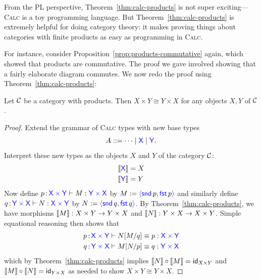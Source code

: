 From the PL perspective, Theorem~\ref{thm:calc-products} is not super exciting---\textsc{Calc}
is a toy programming language.
But Theorem~\ref{thm:calc-products} is extremely helpful for doing category theory:
it makes proving things about categories with finite products
as easy as programming in \textsc{Calc}.

For instance, consider Proposition~\ref{prop:products-commutative} again,
which showed that products are commutative.
The proof we gave involved showing that a fairly elaborate diagram commutes.
We now redo the proof using Theorem~\ref{thm:calc-products}:
\begin{proposition} \label{prop:product-comm-using-calc}
  Let \(\mathcal C\) be a category with products.
  Then \(X\times Y \cong Y \times X\)
  for any objects \(X,Y\) of \(\mathcal C\).
\end{proposition}
\begin{proof}
  Extend the grammar of \textsc{Calc} types with new base types
  \[
  A ::= \dots \mid \mathsf{{\color{blue}X}} \mid \mathsf{{\color{blue}Y}}.
  \]
  Interpret these new types as the objects \(X\) and \(Y\) of the category \(\mathcal C\):
  \begin{align*}
    \left\llbracket \mathsf{{\color{blue}X}}\right\rrbracket &= X \\
    \left\llbracket \mathsf{{\color{blue}Y}}\right\rrbracket &= Y
  \end{align*}
  Now define \(p \,{:}\, \mathsf{{\color{blue}X}} \mathbin{{\color{blue}\times}} \mathsf{{\color{blue}Y}} \vdash M : \mathsf{{\color{blue}Y}} \mathbin{{\color{blue}\times}} \mathsf{{\color{blue}X}}\) by
  \(
  M := \plpair{\plsnd{p}}{\plfst{p}}
  \)
  and similarly define
  \(q \,{:}\, \mathsf{{\color{blue}Y}} \mathbin{{\color{blue}\times}} \mathsf{{\color{blue}X}} \vdash N : \mathsf{{\color{blue}X}} \mathbin{{\color{blue}\times}} \mathsf{{\color{blue}Y}}\) by
  \(N := \plpair{\plsnd{q}}{\plfst{q}}\).
  By Theorem~\ref{thm:calc-products},
  we have morphisms \(\left\llbracket M\right\rrbracket : X \times Y \to Y \times X\)
  and \(\left\llbracket N\right\rrbracket : Y \times X \to X \times Y\).
  Simple equational reasoning then shows that
  \begin{align}
    p\,{:}\,\mathsf{{\color{blue}X}}\mathbin{{\color{blue}\times}}\mathsf{{\color{blue}Y}} \vdash N[M/q] &\equiv p : \mathsf{{\color{blue}X}}\mathbin{{\color{blue}\times}}\mathsf{{\color{blue}Y}}
    \\
    q\,{:}\,\mathsf{{\color{blue}Y}}\mathbin{{\color{blue}\times}}\mathsf{{\color{blue}X}} \vdash M[N/p] &\equiv q : \mathsf{{\color{blue}Y}}\mathbin{{\color{blue}\times}}\mathsf{{\color{blue}X}}
  \end{align}
  which by Theorem~\ref{thm:calc-products}
  implies \(\left\llbracket N\right\rrbracket \circ \left\llbracket M\right\rrbracket = \mathsf{id}_{X\times Y}\)
  and \(\left\llbracket M\right\rrbracket \circ \left\llbracket N\right\rrbracket = \mathsf{id}_{Y\times X}\)
  as needed to show \(X \times Y \cong Y \times X\).
\end{proof}

